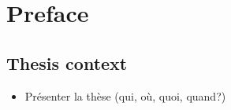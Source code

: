 \chapter*{Preface}
\startcontents[chapters]


\section*{Thesis context}

\begin{itemize}
    \item Présenter la thèse (qui, où, quoi, quand?)
\end{itemize}
